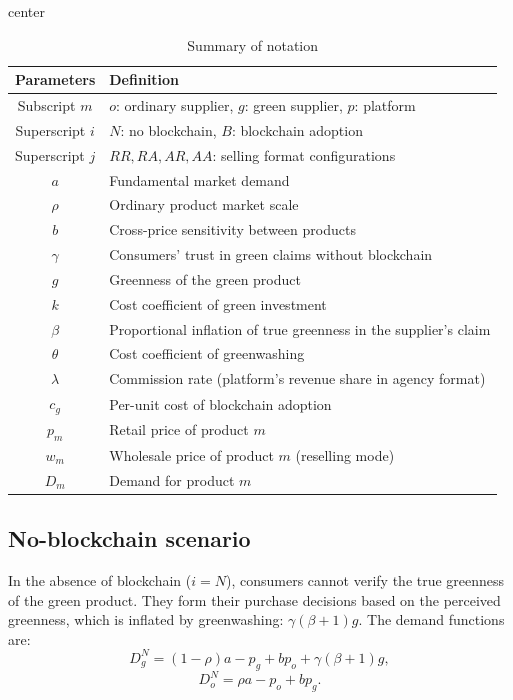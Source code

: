 \documentclass[preprint,review,12pt,authoryear,nopreprintline]{elsarticle}
\theoremstyle{definition}
\begin{document}
\begin{table}[ht!]
\caption{Summary of notation}
\begin{adjustbox}{center}
{\begin{tabular}{c l}
\hline
Parameters & Definition \\
\hline
Subscript $m$ & $o$: ordinary supplier, $g$: green supplier, $p$: platform\\
Superscript $i$ & $N$: no blockchain, $B$: blockchain adoption \\
Superscript $j$ & $RR, RA, AR, AA$: selling format configurations \\
$a$ & Fundamental market demand\\
$\rho$ & Ordinary product market scale \\
 $b$ & Cross-price sensitivity between products \\
 $\gamma$ & Consumers' trust in green claims without blockchain \\
 $g$ & Greenness of the green product \\
 $k$ & Cost coefficient of green investment\\
 $\beta$ & Proportional inflation of true greenness in the supplier's claim \\
   $\theta$ & Cost coefficient of greenwashing\\
 $\lambda$ & Commission rate (platform's revenue share in agency format)\\
 $c_g$ & Per-unit cost of blockchain adoption\\
 $p_m$ & Retail price of product $m$ \\
 $w_m$ & Wholesale price of product $m$ (reselling mode) \\
 $D_m$ & Demand for product $m$ \\
 \hline
    \end{tabular}}
    \end{adjustbox}
   \label{tab:notation}
\end{table}

\subsection{No-blockchain scenario}

In the absence of blockchain ($i = N$), consumers cannot verify the true greenness of the green product. They form their purchase decisions based on the perceived greenness, which is inflated by greenwashing: $\gamma(\beta + 1)g$. The demand functions are:
\begin{equation}
D_g^{N}=(1-\rho)a-p_g+bp_o+\gamma(\beta+1)g,
\end{equation}
\begin{equation}
D_o^{N}=\rho a-p_o+bp_g.
\end{equation}
\end{document}
